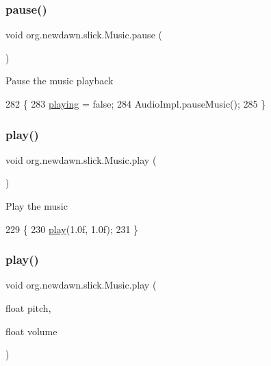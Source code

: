 \subsubsection{\texorpdfstring{pause()}{pause()}}
{\footnotesize\ttfamily void org.\+newdawn.\+slick.\+Music.\+pause (\begin{DoxyParamCaption}{ }\end{DoxyParamCaption})\hspace{0.3cm}{\ttfamily [inline]}}

Pause the music playback 
\begin{DoxyCode}
282                         \{
283         \mbox{\hyperlink{classorg_1_1newdawn_1_1slick_1_1_music_a20709d497ca9027d874f7ffe970ce738}{playing}} = \textcolor{keyword}{false};
284         AudioImpl.pauseMusic();
285     \}
\end{DoxyCode}
\mbox{\label{classorg_1_1newdawn_1_1slick_1_1_music_a605a881eef7e5a4cca79cdeec7234fd0}} 
\subsubsection{\texorpdfstring{play()}{play()}\hspace{0.1cm}{\footnotesize\ttfamily [1/2]}}
{\footnotesize\ttfamily void org.\+newdawn.\+slick.\+Music.\+play (\begin{DoxyParamCaption}{ }\end{DoxyParamCaption})\hspace{0.3cm}{\ttfamily [inline]}}

Play the music 
\begin{DoxyCode}
229                        \{
230         \mbox{\hyperlink{classorg_1_1newdawn_1_1slick_1_1_music_a605a881eef7e5a4cca79cdeec7234fd0}{play}}(1.0f, 1.0f); 
231     \}
\end{DoxyCode}
\mbox{\label{classorg_1_1newdawn_1_1slick_1_1_music_ac9d025e830a97f7a14a08fe5b3342324}} 
\subsubsection{\texorpdfstring{play()}{play()}\hspace{0.1cm}{\footnotesize\ttfamily [2/2]}}
{\footnotesize\ttfamily void org.\+newdawn.\+slick.\+Music.\+play (\begin{DoxyParamCaption}\item[{float}]{pitch,  }\item[{float}]{volume }\end{DoxyParamCaption})\hspace{0.3cm}{\ttfamily [inline]}}

